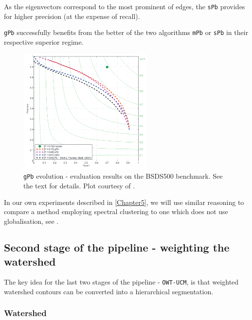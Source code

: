 As the eigenvectors correspond to the most prominent of edges, the {\tt sPb} provides for higher precision (at the expense of recall). 

{\tt gPb} successfully benefits from the better of the two algorithms {\tt mPb} or {\tt sPb} in their respective superior regime.

\begin{figure}[ht!]
 \centering
 \includegraphics[width=0.6\textwidth]{images/gPb-OWT-UCM/Pb_mPb_sPb_gPb.png}
 \caption[{\tt gPb} evolution - plot results on the BSDS500 benchmark.]{{\tt gPb} evolution - evaluation results on the BSDS500 benchmark. See the text for details. Plot courtesy of \cite{Arbelaez11}.}
 \label{fig:Pb_mPb_sPb_gPb}
\end{figure}

In our own experiments described in \cref{Chapter5}, we will use similar reasoning to compare a method employing spectral clustering to one which does not use globalisation, see .

\subsection{Second stage of the pipeline - weighting the watershed} %
The key idea for the last two stages %
of the pipeline - {\tt OWT-UCM}, is that weighted watershed contours can be converted into a hierarchical segmentation.

\subsubsection{Watershed}
\label{sec:ch3-watershed}

